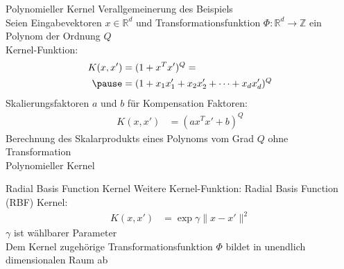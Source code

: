 \documentclass[ngerman]{beamer}
\newcommand{\norm}[1]{\lVert#1\rVert}
\begin{document}
\begin{frame}{Polynomieller Kernel}
    Verallgemeinerung des Beispiels \\
    Seien Eingabevektoren $x \in \mathbb{R}^d$ und Transformationsfunktion $\Phi: \mathbb{R}^d \rightarrow \mathbb{Z}$ ein Polynom der Ordnung $Q$ \\
    Kernel-Funktion: \\
    \begin{equation*} \label{eq:poly_kernel_pres}
    \begin{aligned}
        K(x, x') &= (1 + x^{T}x')^{Q} = \\ \pause
        &= (1 + x_{1} x_{1}' + x_{2} x_{2}' + \dots + x_{d} x_{d}')^{Q}
    \end{aligned}
    \end{equation*} \pause
    Skalierungsfaktoren $a$ und $b$ für Kompensation Faktoren: \\
    \begin{equation*} \label{eq:poly_kernel2_pres}
    \begin{aligned}
        K(x, x') &= (a x^{T}x' + b)^{Q}
    \end{aligned}
    \end{equation*} \pause
    Berechnung des Skalarprodukts eines Polynoms vom Grad $Q$ ohne Transformation \\ \pause
    Polynomieller Kernel
\end{frame}

\begin{frame}{Radial Basis Function Kernel}
    Weitere Kernel-Funktion: Radial Basis Function (RBF) Kernel: \\ \pause
    \begin{equation*} \label{eq:rbfk_pres}
    \begin{aligned}
        K(x, x') &= \exp{\gamma \norm{x - x'}^2}
    \end{aligned}
    \end{equation*} \pause
    $\gamma$ ist wählbarer Parameter \\ \pause
    Dem Kernel zugehörige Transformationsfunktion $\Phi$ bildet in unendlich dimensionalen Raum ab
\end{frame}
\end{document}
